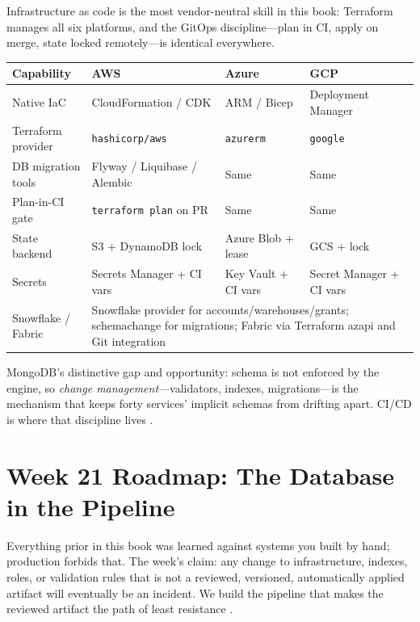 \begin{crosscloud}
Infrastructure as code is the most vendor-neutral skill in this book: Terraform manages all six platforms, and the GitOps discipline---plan in CI, apply on merge, state locked remotely---is identical everywhere.

\vspace{2mm}
{\footnotesize
\begin{tabular}{@{}p{2.9cm}p{3.0cm}p{3.0cm}p{3.0cm}@{}} 
\toprule
\textbf{Capability} & \textbf{AWS} & \textbf{Azure} & \textbf{GCP} \\
\midrule
Native IaC & CloudFormation / CDK & ARM / Bicep & Deployment Manager \\
Terraform provider & \texttt{hashicorp/aws} & \texttt{azurerm} & \texttt{google} \\
DB migration tools & Flyway / Liquibase / Alembic & Same & Same \\
Plan-in-CI gate & \texttt{terraform plan} on PR & Same & Same \\
State backend & S3 + DynamoDB lock & Azure Blob + lease & GCS + lock \\
Secrets & Secrets Manager + CI vars & Key Vault + CI vars & Secret Manager + CI vars \\
\addlinespace
Snowflake / Fabric & \multicolumn{3}{l}{Snowflake provider for accounts/warehouses/grants; schemachange for migrations; Fabric via Terraform azapi and Git integration} \\
\bottomrule
\end{tabular}}

\vspace{1mm}
MongoDB's distinctive gap and opportunity: schema is not enforced by the engine, so \emph{change management}---validators, indexes, migrations---is the mechanism that keeps forty services' implicit schemas from drifting apart. CI/CD is where that discipline lives \cite{mongodbTerraformDocs,terraformDocs}.
\end{crosscloud}

\section{Week 21 Roadmap: The Database in the Pipeline}
Everything prior in this book was learned against systems you built by hand; production forbids that. The week's claim: any change to infrastructure, indexes, roles, or validation rules that is not a reviewed, versioned, automatically applied artifact will eventually be an incident. We build the pipeline that makes the reviewed artifact the path of least resistance \cite{mongodbTerraformDocs}.

